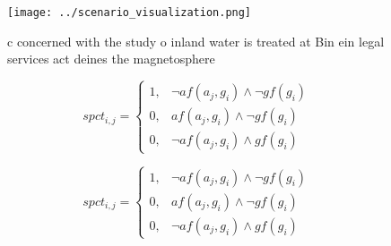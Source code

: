 \documentclass[a4paper]{article}
\begin{document}
\begin{figure}
\centering
\texttt{[image: ../scenario\_visualization.png]}
\caption{ c concerned with the study o inland water is treated at Bin ein legal services act deines the magnetosphere 
}
\end{figure}
 
\begin{equation}
spct_{i,j} =
\begin{cases}
1, & \text{$\neg af(a_j,g_i) \wedge \neg gf(g_i)$}\\
0, & \text{$af(a_j,g_i) \wedge \neg gf(g_i)$}\\
0, & \text{$\neg af(a_j,g_i) \wedge gf(g_i)$}
\end{cases}
\end{equation}

\begin{equation}
spct_{i,j} =
\begin{cases}
1, & \text{$\neg af(a_j,g_i) \wedge \neg gf(g_i)$}\\
0, & \text{$af(a_j,g_i) \wedge \neg gf(g_i)$}\\
0, & \text{$\neg af(a_j,g_i) \wedge gf(g_i)$}
\end{cases}
\end{equation}
\end{document}
